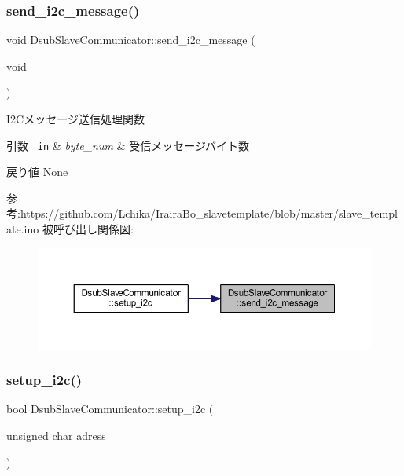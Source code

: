\subsubsection{\texorpdfstring{send\_i2c\_message()}{send\_i2c\_message()}}
{\footnotesize\ttfamily void Dsub\+Slave\+Communicator\+::send\+\_\+i2c\+\_\+message (\begin{DoxyParamCaption}\item[{void}]{ }\end{DoxyParamCaption})\hspace{0.3cm}{\ttfamily [static]}}



I2\+Cメッセージ送信処理関数 


\begin{DoxyParams}[1]{引数}
\mbox{\texttt{ in}}  & {\em byte\+\_\+num} & 受信メッセージバイト数 \\
\hline
\end{DoxyParams}
\begin{DoxyReturn}{戻り値}
None
\end{DoxyReturn}
参考\+:https\+://github.com/\+Lchika/\+Iraira\+Bo\+\_\+slavetemplate/blob/master/slave\+\_\+template.\+ino 被呼び出し関係図\+:\nopagebreak
\begin{figure}[H]
\begin{center}
\leavevmode
\includegraphics[width=350pt]{class_dsub_slave_communicator_a0a49728ad2bec47e0cb6e6ee93f0182b_icgraph}
\end{center}
\end{figure}
\mbox{\label{class_dsub_slave_communicator_a38614c9732f810200a8429dd4bac88aa}} 
\subsubsection{\texorpdfstring{setup\_i2c()}{setup\_i2c()}}
{\footnotesize\ttfamily bool Dsub\+Slave\+Communicator\+::setup\+\_\+i2c (\begin{DoxyParamCaption}\item[{unsigned char}]{adress }\end{DoxyParamCaption})}



